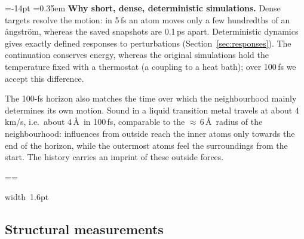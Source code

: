 \documentclass[11pt,a4paper]{article}
\makeatletter
\numberwithin{equation}{section}
\newcommand{\pcmWhyPiece}[1]{%
  \noindent\hbox{{\color{pcmAmber}\vrule width 1.6pt}%
    \setlength{\fboxsep}{7pt}\colorbox{pcmAmber!5}{\vbox{\unvbox#1}}}\par}
\newcommand{\pcmWhyEmit}{%
  \vbadness=10000
  \loop
    \par
    \ifdim\pagegoal=\maxdimen
      \pcmWhyAvail=\dimexpr\vsize-14pt\relax
    \else
      \pcmWhyAvail=\dimexpr\pagegoal-\pagetotal-19pt\relax
    \fi
    \ifdim\dimexpr\ht\pcmWhyAll+\dp\pcmWhyAll\relax>\pcmWhyAvail
      \ifdim\pcmWhyAvail<3\baselineskip
        \newpage
      \else
        \setbox\pcmWhyPart\vsplit\pcmWhyAll to \pcmWhyAvail
        \pcmWhyPiece\pcmWhyPart
      \fi
    \else
      \pcmWhyPiece\pcmWhyAll
    \fi
  \ifvoid\pcmWhyAll\else\repeat}
\newenvironment{why}[1][Why]{%
  \par\addvspace{.55em}%
  \setbox\pcmWhyAll\vbox\bgroup
    \hsize=\dimexpr\linewidth-1.6pt-14pt\relax
    \@parboxrestore\fussy
    \parskip=0.35em\relax
    \noindent\textcolor{pcmAmber}{\bfseries #1.}\enspace\ignorespaces}%
 {\par\egroup
  \splittopskip=\topskip\splitmaxdepth=\maxdepth
  \pcmWhyEmit
  \par\addvspace{.55em}}
\makeatother
\begin{document}
\begin{why}[Why short, dense, deterministic simulations]
Dense targets resolve the motion: in 5\,fs an atom moves only a few hundredths of
an \aa ngstr\"om, whereas the saved snapshots are 0.1\,ps apart. Deterministic
dynamics gives exactly defined responses to perturbations
(Section~\ref{sec:responses}). The continuation conserves energy, whereas the
original simulations hold the temperature fixed with a thermostat (a coupling to a
heat bath); over 100\,fs we accept this difference.

The 100-fs horizon also matches the time over which the neighbourhood mainly
determines its own motion. Sound in a liquid transition metal travels at about
4\,km/s, i.e.\ about 4\,\AA\ in 100\,fs, comparable to the ${\approx}\,6$\,\AA\
radius of the neighbourhood: influences from outside reach the inner atoms only
towards the end of the horizon, while the outermost atoms feel the surroundings
from the start. The history carries an imprint of these outside forces.
\end{why}

\subsection{Structural measurements}
\label{sec:measurements}
\end{document}
